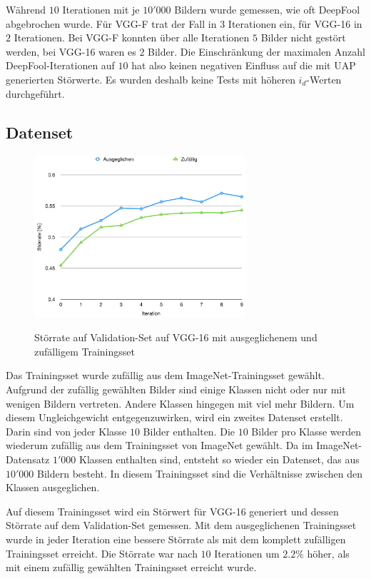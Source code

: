 \documentclass{FFHS_Thesis_Additions/ffhsthesis}
\begin{document}
 Während $10$ Iterationen mit je $10'000$ Bildern wurde gemessen, wie oft DeepFool abgebrochen wurde. Für VGG-F trat der Fall in $3$ Iterationen ein, für VGG-16 in $2$ Iterationen. Bei VGG-F konnten über alle Iterationen $5$ Bilder nicht gestört werden, bei VGG-16 waren es $2$ Bilder. Die Einschränkung der maximalen Anzahl DeepFool-Iterationen auf $10$ hat also keinen negativen Einfluss auf die mit UAP generierten Störwerte. Es wurden deshalb keine Tests mit höheren $i_d$-Werten durchgeführt.

\subsection{Datenset}



\begin{figure}[h]
\caption{Störrate auf Validation-Set auf VGG-16 mit ausgeglichenem und zufälligem Trainingsset}
\centering
\includegraphics[width=0.7\textwidth]{./images/einfluss_dataset.png}
\label{fig_einfluss_datenset}
\end{figure}


Das Trainingsset wurde zufällig aus dem ImageNet-Trainingsset \cite{russakovsky_imagenet_2015} gewählt. 
Aufgrund der zufällig gewählten Bilder sind einige Klassen nicht oder nur mit wenigen Bildern vertreten. 
Andere Klassen hingegen mit viel mehr Bildern. 
Um diesem Ungleichgewicht entgegenzuwirken, wird ein zweites Datenset erstellt. 
Darin sind von jeder Klasse $10$ Bilder enthalten. 
Die $10$ Bilder pro Klasse werden wiederum zufällig aus dem Trainingsset von ImageNet gewählt. 
Da im ImageNet-Datensatz $1'000$ Klassen enthalten sind, entsteht so wieder ein Datenset, das aus $10'000$ Bildern besteht. 
In diesem Trainingsset sind die Verhältnisse zwischen den Klassen ausgeglichen.

Auf diesem Trainingsset wird ein Störwert für VGG-16 generiert und dessen Störrate auf dem Validation-Set gemessen. 
Mit dem ausgeglichenen Trainingsset wurde in jeder Iteration eine bessere Störrate als mit dem komplett zufälligen Trainingsset erreicht. 
Die Störrate war nach $10$ Iterationen um $2.2\%$ höher, als mit einem zufällig gewählten Trainingsset erreicht wurde. 
\end{document}
